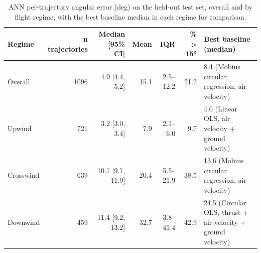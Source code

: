 \begin{table}[h!]
    \centering
    \caption{ANN per-trajectory angular error (deg) on the held-out test set, overall and by flight regime, with the best baseline median in each regime for comparison.}
    \label{tab:ann_regime}
    \begin{tabular}{@{}lrrrrrl@{}}
        \toprule
        Regime & n trajectories & Median [95\% CI] & Mean & IQR & \% > 15° & Best baseline (median) \\
        \midrule
        Overall & 1096 & 4.9 [4.4, 5.2] & 15.1 & 2.5–12.2 & 21.2 & 8.4 (Möbius circular regression, air velocity) \\
        Upwind & 721 & 3.2 [3.0, 3.4] & 7.9 & 2.1–6.0 & 9.7 & 4.0 (Linear OLS, air velocity + ground velocity) \\
        Crosswind & 639 & 10.7 [9.7, 11.9] & 20.4 & 5.5–21.9 & 38.5 & 13.6 (Möbius circular regression, air velocity) \\
        Downwind & 459 & 11.4 [9.2, 13.2] & 32.7 & 3.8–41.4 & 42.9 & 24.5 (Circular OLS, thrust + air velocity + ground velocity) \\
        \bottomrule
    \end{tabular}
\end{table}
